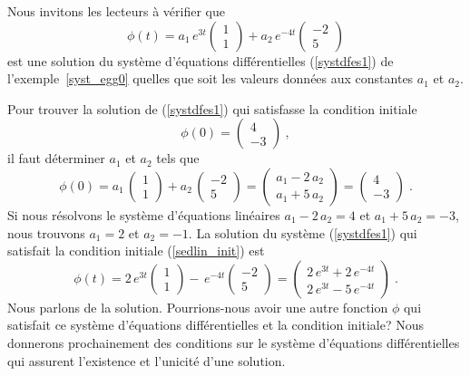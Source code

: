 {\begin{egg}
Nous invitons les lecteurs à vérifier que
\[
\phi(t) = a_1 \, e^{3t} \begin{pmatrix} 1 \\ 1 \end{pmatrix}
+ a_2\, e^{-4t} \begin{pmatrix} -2 \\ 5 \end{pmatrix}
\]
est une solution du système d'équations différentielles
(\ref{systdfes1}) de l'exemple~\ref{syst_egg0} quelles que soit les
valeurs données aux constantes $a_1$ et $a_2$.

Pour trouver la solution de (\ref{systdfes1}) qui satisfasse la
condition initiale
\begin{equation}
\phi(0)= \begin{pmatrix} 4 \\ -3 \end{pmatrix}  \ , \label{sedlin_init}
\end{equation}
il faut déterminer $a_1$ et $a_2$ tels que
\[
\phi(0) = a_1 \, \begin{pmatrix} 1 \\ 1 \end{pmatrix}
+ a_2\,\begin{pmatrix} -2 \\ 5 \end{pmatrix}
= \begin{pmatrix} a_1-2\,a_2 \\ a_1 + 5\,a_2 \end{pmatrix}
= \begin{pmatrix} 4 \\ -3 \end{pmatrix}  \; .
\]
Si nous résolvons le système d'équations linéaires
$a_1-2\,a_2 = 4$ et $a_1+5\,a_2 = -3$, nous trouvons $a_1=2$ et $a_2=-1$.
La solution du système (\ref{systdfes1}) qui satisfait la condition
initiale (\ref{sedlin_init}) est
\[
\phi(t) = 2 \, e^{3t} \begin{pmatrix} 1 \\ 1 \end{pmatrix}
- \, e^{-4t} \begin{pmatrix} -2 \\ 5 \end{pmatrix}
= \begin{pmatrix} 2 \, e^{3t} + 2\, e^{-4t} \\
2 \, e^{3t} -5 \, e^{-4t}
\end{pmatrix} \; .
\]
Nous parlons de \lgm la solution\rgm.  Pourrions-nous avoir une autre
fonction $\phi$ qui satisfait ce système d'équations différentielles
et la condition initiale?  Nous donnerons prochainement des conditions
sur le système d'équations différentielles qui assurent l'existence et
l'unicité d'une solution.
\label{syst_egg1}
\end{egg}

}
